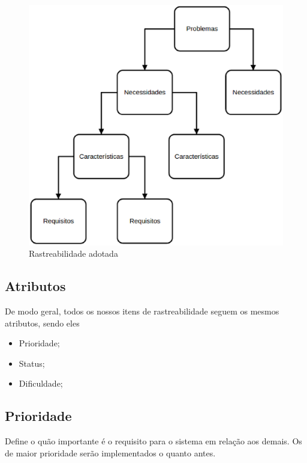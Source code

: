 \begin{apendicesenv}
\begin{figure}[htb]
	\centering
	\label{rastreabilidade2}
		\includegraphics[keepaspectratio=true,scale=0.6]{figuras/rastreabilidade2.eps}
	\caption{Rastreabilidade adotada}
\end{figure}

\clearpage{}

\subsection {Atributos}

De modo geral, todos os nossos itens de rastreabilidade seguem os mesmos atributos, sendo eles

\begin{itemize}

\item{Prioridade;}
\item{Status;}
\item{Dificuldade;}

\end{itemize}

\subsection{Prioridade}

Define o quão importante é o requisito para o sistema em relação aos demais. Os de maior prioridade serão implementados o quanto antes.


\end{apendicesenv}
